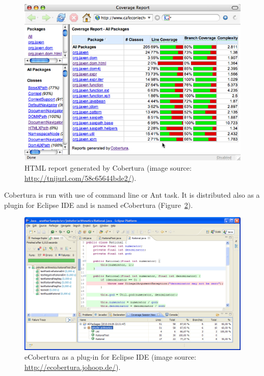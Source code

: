 \begin{figure}[h!]
	\centering
	\includegraphics[scale=0.5]{img/coverage.jpg} 
	\caption{HTML report generated by Cobertura (image source: \url{http://tnijurl.com/58c65644bde2/}).}		
	\label{fig:coverage1}
\end{figure}

Cobertura is run with use of command line or Ant task. It is distributed also as a plugin for Eclipse IDE and is named eCobertura (Figure~\ref{fig:coverage2}). 

\begin{figure}[h!]
	\centering
	\includegraphics[scale=0.4]{img/screenshot_ecobertura_01.png}  
	\caption{eCobertura as a plug-in for Eclipse IDE (image source: \url{http://ecobertura.johoop.de/}).}		
	\label{fig:coverage2}
\end{figure}


